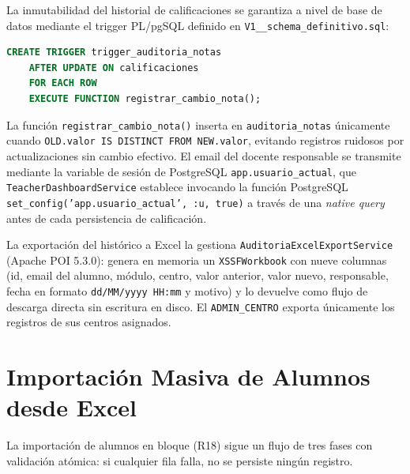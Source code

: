 \documentclass[12pt, a4paper]{report}
\begin{document}
La inmutabilidad del historial de calificaciones se garantiza a nivel de base de
datos mediante el trigger PL/pgSQL definido en \texttt{V1\_\_schema\_definitivo.sql}:

\begin{lstlisting}[language=SQL]
CREATE TRIGGER trigger_auditoria_notas
    AFTER UPDATE ON calificaciones
    FOR EACH ROW
    EXECUTE FUNCTION registrar_cambio_nota();
\end{lstlisting}

La función \texttt{registrar\_cambio\_nota()} inserta en \texttt{auditoria\_notas}
únicamente cuando \texttt{OLD.valor IS DISTINCT FROM NEW.valor}, evitando registros
ruidosos por actualizaciones sin cambio efectivo. El email del docente responsable
se transmite mediante la variable de sesión de PostgreSQL
\texttt{app.usuario\_actual}, que \texttt{TeacherDashboardService} establece
invocando la función PostgreSQL \texttt{set\_config('app.usuario\_actual', :u, true)}
a través de una \textit{native query} antes de cada persistencia de calificación.

La exportación del histórico a Excel la gestiona \texttt{AuditoriaExcelExportService}
(Apache POI 5.3.0): genera en memoria un \texttt{XSSFWorkbook} con nueve columnas
(id, email del alumno, módulo, centro, valor anterior, valor nuevo, responsable,
fecha en formato \texttt{dd/MM/yyyy HH:mm} y motivo) y lo devuelve como flujo de
descarga directa sin escritura en disco. El \texttt{ADMIN\_CENTRO} exporta
únicamente los registros de sus centros asignados.

\section{Importación Masiva de Alumnos desde Excel}

La importación de alumnos en bloque (R18) sigue un flujo de tres fases con
validación atómica: si cualquier fila falla, no se persiste ningún registro.
\end{document}
